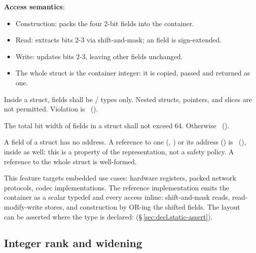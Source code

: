 \pnum
\textbf{Access semantics}:
\begin{itemize}
  \item Construction:  packs the four
        2-bit fields into the container.
  \item Read:  extracts bits 2-3 via shift-and-mask; an  field is
        sign-extended.
  \item Write:  updates bits 2-3, leaving other
        fields unchanged.
  \item The whole struct is the container integer: it is copied, passed and returned as one.
\end{itemize}

\begin{constraint}
  Inside a \tok{[packed]} struct, fields shall be /
  types only. Nested structs, pointers, and slices are not permitted.
  Violation is \illformed{}~().
\end{constraint}

\begin{constraint}
  The total bit width of fields in a \tok{[packed]} struct shall not
  exceed 64. Otherwise \illformed{}~().
\end{constraint}

\begin{constraint}
  A field of a \tok{[packed]} struct has no address. A  reference to one
  (, ) or its address () is
  \illformed{}~(), inside  as well: this is a property of the
  representation, not a safety policy. A  reference to the whole struct is well-formed.
\end{constraint}

\begin{note}
  This feature targets embedded use cases: hardware registers,
  packed network protocols, codec implementations. The reference
  implementation emits the container as a scalar typedef and every access inline:
  shift-and-mask reads, read-modify-write stores, and construction by OR-ing the shifted
  fields. The layout can be asserted where the type is declared:
   (\S\,\ref{sec:decl.static-assert}).
\end{note}

\subsection{Integer rank and widening}
\label{sec:types.rank}


